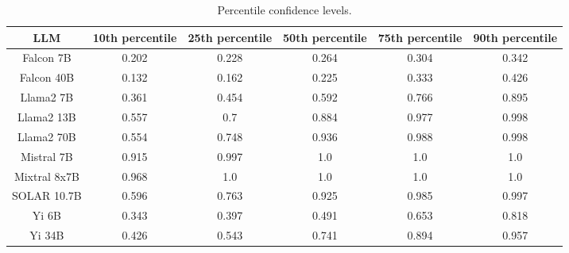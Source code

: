 \begin{table*}
\centering
\begin{tabular}{c|c|c|c|c|c}
LLM & 10th percentile & 25th percentile & 50th percentile & 75th percentile & 90th percentile\\ \hline
Falcon 7B & 0.202 & 0.228 & 0.264 & 0.304 & 0.342\\
Falcon 40B & 0.132 & 0.162 & 0.225 & 0.333 & 0.426\\
Llama2 7B & 0.361 & 0.454 & 0.592 & 0.766 & 0.895\\
Llama2 13B & 0.557 & 0.7 & 0.884 & 0.977 & 0.998\\
Llama2 70B & 0.554 & 0.748 & 0.936 & 0.988 & 0.998\\
Mistral 7B & 0.915 & 0.997 & 1.0 & 1.0 & 1.0\\
Mixtral 8x7B & 0.968 & 1.0 & 1.0 & 1.0 & 1.0\\
SOLAR 10.7B & 0.596 & 0.763 & 0.925 & 0.985 & 0.997\\
Yi 6B & 0.343 & 0.397 & 0.491 & 0.653 & 0.818\\
Yi 34B & 0.426 & 0.543 & 0.741 & 0.894 & 0.957\\
\hline
\end{tabular}
\caption{Percentile confidence levels.}
\label{tab:percentile_conf}
\end{table*}
